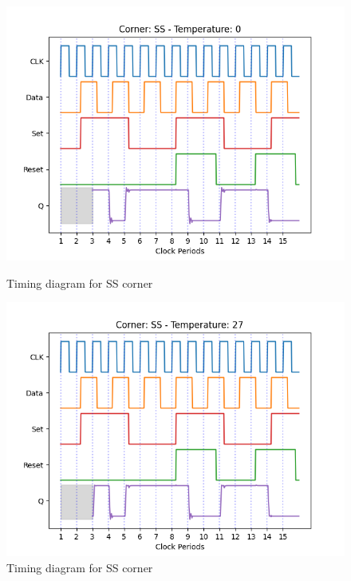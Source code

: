 \begin{figure}[H]
    \begin{minipage}{0.5\textwidth}
        \centering
        \includegraphics[width=\textwidth]{Figures/Aimspice_Plots/SS_0.png}
        \caption{Timing diagram for SS corner}
        \label{fig:SS0}
    \end{minipage}%
    \begin{minipage}{0.5\textwidth}
        \centering
        \includegraphics[width=\textwidth]{Figures/Aimspice_Plots/SS_27.png}
        \caption{Timing diagram for SS corner}
        \label{fig:SS27}
    \end{minipage}
\end{figure}
